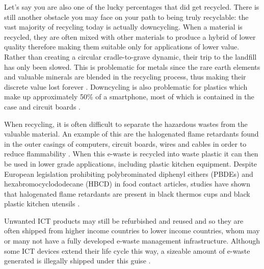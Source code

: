 \documentclass{article}
\newcounter{subsubsubsection}[subsubsection]
\begin{document}
Let's say you are also one of the lucky percentages that did get recycled. There is still another obstacle you may face on your path to being truly recyclable: the vast majority of recycling today is actually downcycling. When a material is recycled, they are often mixed with other materials to produce a hybrid of lower quality therefore making them suitable only for applications of lower value. Rather than creating a circular cradle-to-grave dynamic, their trip to the landfill has only been slowed. This is problematic for metals since the rare earth elements and valuable minerals are blended in the recycling process, thus making their discrete value lost forever \cite{braungart2007cradle}. Downcycling is also problematic for plastics which make up approximately 50\% of a smartphone, most of which is contained in the case and circuit boards \cite{bournay2006vital}.

When recycling, it is often difficult to separate the hazardous wastes from the valuable material. An example of this are the halogenated flame retardants found in the outer casings of computers, circuit boards, wires and cables in order to reduce flammability \cite{williams2011environmental, forti2020global}. When this e-waste is recycled into waste plastic it can then be used in lower grade applications, including plastic kitchen equipment. Despite European legislation prohibiting polybrominated diphenyl eithers (PBDEs) and hexabromocyclododecane (HBCD) in food contact articles, studies have shown that halogenated flame retardants are present in black thermos cups and black plastic kitchen utensils \cite{samsonek2013occurrence}.


Unwanted ICT products may still be refurbished and reused and so they are often shipped from higher income countries to lower income countries, whom may or many not have a fully developed e-waste management infrastructure. Although some ICT devices extend their life cycle this way, a sizeable amount of e-waste generated is illegally shipped under this guise \cite{forti2020global}. %
\end{document}
